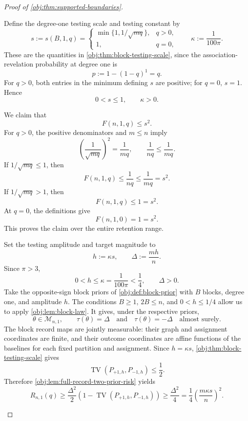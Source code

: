 \begin{proof}[Proof of \cref{obj:thm:supported-boundaries}]
\begin{enumerate}
Define the degree-one testing scale and testing constant by
\[
s:=s(B,1,q)=
\begin{cases}
\min\{1,1/\sqrt{mq}\},&q>0,\\
1,&q=0,
\end{cases}
\qquad
\kappa:=\frac1{100\pi}.
\]
These are the quantities in \cref{obj:thm:block-testing-scale}, since the association-revelation probability at degree one is
\[
p:=1-(1-q)^1=q.
\]
For \(q>0\), both entries in the minimum defining \(s\) are positive; for \(q=0\), \(s=1\). Hence
\[
0<s\le1,\qquad \kappa>0.
\]

We claim that
\[
F(n,1,q)\le s^2.
\]
For \(q>0\), the positive denominators and \(m\le n\) imply
\[
\left(\frac1{\sqrt{mq}}\right)^2=\frac1{mq},
\qquad
\frac1{nq}\le\frac1{mq}.
\]
If \(1/\sqrt{mq}\le1\), then
\[
F(n,1,q)\le\frac1{nq}
\le\frac1{mq}=s^2.
\]
If \(1/\sqrt{mq}>1\), then
\[
F(n,1,q)\le1=s^2.
\]
At \(q=0\), the definitions give
\[
F(n,1,0)=1=s^2.
\]
This proves the claim over the entire retention range.

Set the testing amplitude and target magnitude to
\[
h:=\kappa s,
\qquad
\Delta:=\frac{mh}{n}.
\]
Since \(\pi>3\),
\[
0<h\le\kappa=\frac1{100\pi}<\frac14,
\qquad
\Delta>0.
\]
Take the opposite-sign block priors of \cref{obj:def:block-prior} with \(B\) blocks, degree one, and amplitude \(h\). The conditions \(B\ge1\), \(2B\le n\), and \(0<h\le1/4\) allow us to apply \cref{obj:lem:block-law}. It gives, under the respective priors,
\[
\theta\in\mathcal M_{n,1},
\qquad
\tau(\theta)=\Delta
\quad\text{and}\quad
\tau(\theta)=-\Delta
\quad\text{almost surely}.
\]
The block record maps are jointly measurable: their graph and assignment coordinates are finite, and their outcome coordinates are affine functions of the baselines for each fixed partition and assignment. Since \(h=\kappa s\), \cref{obj:thm:block-testing-scale} gives
\[
\operatorname{TV}(P_{+1,h},P_{-1,h})\le\frac12.
\]
Therefore \cref{obj:lem:full-record-two-prior-risk} yields
\[
R_{n,1}(q)
\ge
\frac{\Delta^2}{2}
\left(1-\operatorname{TV}(P_{+1,h},P_{-1,h})\right)
\ge
\frac{\Delta^2}{4}
=
\frac14\left(\frac{m\kappa s}{n}\right)^2.
\]


\end{enumerate}
\end{proof}
